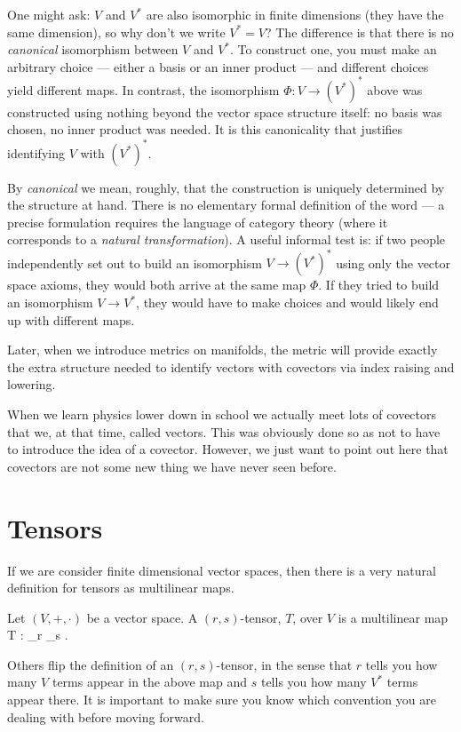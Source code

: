 \br
    One might ask: $V$ and $V^*$ are also isomorphic in finite dimensions (they have the same dimension), so why don't we write $V^* = V$? The difference is that there is no \textit{canonical} isomorphism between $V$ and $V^*$. To construct one, you must make an arbitrary choice --- either a basis or an inner product --- and different choices yield different maps. In contrast, the isomorphism $\Phi: V\to(V^*)^*$ above was constructed using nothing beyond the vector space structure itself: no basis was chosen, no inner product was needed. It is this canonicality that justifies identifying $V$ with $(V^*)^*$.

    By \textit{canonical} we mean, roughly, that the construction is uniquely determined by the structure at hand. There is no elementary formal definition of the word --- a precise formulation requires the language of category theory (where it corresponds to a \textit{natural transformation}). A useful informal test is: if two people independently set out to build an isomorphism $V \to (V^*)^*$ using only the vector space axioms, they would both arrive at the same map $\Phi$. If they tried to build an isomorphism $V \to V^*$, they would have to make choices and would likely end up with different maps.

    Later, when we introduce metrics on manifolds, the metric will provide exactly the extra structure needed to identify vectors with covectors via index raising and lowering.
\er

\br
    When we learn physics lower down in school we actually meet lots of covectors that we, at that time, called vectors. This was obviously done so as not to have to introduce the idea of a covector. However, we just want to point out here that covectors are not some new thing we have never seen before.
\er

\section{Tensors}

If we are consider finite dimensional vector spaces, then there is a very natural definition for tensors as multilinear maps. 

\bd[Tensor] 
    Let $(V,+,\cdot)$ be a vector space. A $(r,s)$-tensor, $T$, over $V$ is a multilinear map 
    \bse 
        T : _{r} \times {}_{s} \lmap \R. 
    \ese 
\ed 

\br 
    Others flip the definition of an $(r,s)$-tensor, in the sense that $r$ tells you how many $V$ terms appear in the above map and $s$ tells you how many $V^*$ terms appear there. It is important to make sure you know which convention you are dealing with before moving forward. 
\er 

